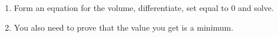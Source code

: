 \begin{minipage}{\linewidth}
\begin{minipage}[c]{0.29\linewidth}
		\label{fig:BoxFromARectangle_BoxAfterFolding}
	\end{minipage}
	\label{fig:BoxFromARectangle_Question}
\end{minipage}

\begin{hints}
	\begin{enumerate}
		\item Form an equation for the volume, differentiate, set equal to 0 and solve.
		\item You also need to prove that the value you get is a minimum.
	\end{enumerate}
\end{hints}

